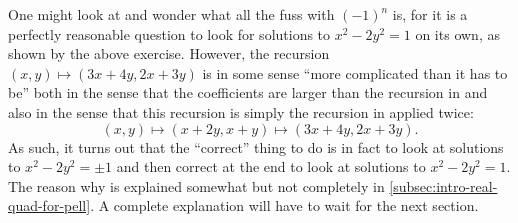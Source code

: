 \documentclass[../notes.tex]{subfiles}
\begin{document}
One might look at  and wonder what all the fuss with $(-1)^n$ is, for it is a perfectly reasonable question to look for solutions to $x^2-2y^2=1$ on its own, as shown by the above exercise. However, the recursion $(x,y)\mapsto(3x+4y,2x+3y)$ is in some sense ``more complicated than it has to be'' both in the sense that the coefficients are larger than the recursion in  and also in the sense that this recursion is simply the recursion in  applied twice:
\[(x,y)\mapsto(x+2y,x+y)\mapsto(3x+4y,2x+3y).\]
As such, it turns out that the ``correct'' thing to do is in fact to look at solutions to $x^2-2y^2=\pm1$ and then correct at the end to look at solutions to $x^2-2y^2=1$. The reason why is explained somewhat but not completely in \cref{subsec:intro-real-quad-for-pell}. A complete explanation will have to wait for the next section.
\end{document}
